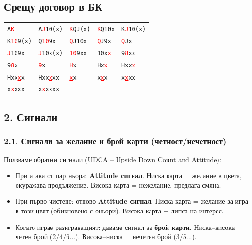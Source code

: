 \documentclass[10pt,a5paper]{extarticle}
\newcommand{\leadhil}[1]{\textcolor{red}{\uline{#1}}}
\begin{document}

\subsection*{Срещу договор в БК}

\begin{center}
\renewcommand{\arraystretch}{1.3} %
\setlength{\tabcolsep}{6pt}       %

\begin{tabularx}{\textwidth}{|X|X|X|X|X|}
\hline
\texttt{A\leadhil{K}} & \texttt{A\leadhil{J}10(x)} & \texttt{\leadhil{K}QJ(x)} & \texttt{\leadhil{K}Q10x} & \texttt{K\leadhil{J}10(x)} \\
\texttt{K\leadhil{10}9(x)} & \texttt{Q\leadhil{10}9x} & \texttt{\leadhil{Q}J10x} & \texttt{\leadhil{Q}J9x} & \texttt{\leadhil{Q}Jx} \\
\texttt{\leadhil{J}109x} & \texttt{\leadhil{J}10x(x)} & \texttt{\leadhil{10}9xx} & \texttt{10x\leadhil{x}} & \texttt{9\leadhil{8}xx} \\
\texttt{9\leadhil{8}x} & \texttt{\leadhil{9}x} & \texttt{\leadhil{H}x} & \texttt{Hx\leadhil{x}} & \texttt{Hxx\leadhil{x}} \\
\texttt{Hxx\leadhil{x}x} & \texttt{Hxx\leadhil{x}xx} & \texttt{\leadhil{x}x} & \texttt{x\leadhil{x}x} & \texttt{x\leadhil{x}xx} \\
\texttt{x\leadhil{x}xxx} & \texttt{x\leadhil{x}xxxx} & & & \\ %
\hline
\end{tabularx}
\end{center}

\subsection*{2. Сигнали}

\subsubsection*{2.1. Сигнали за желание и брой карти (четност/нечетност)}
Ползваме обратни сигнали (UDCA – Upside Down Count and Attitude):  
\begin{itemize}
    \item[] При атака от партньора: \textbf{Attitude сигнал}.  
        Ниска карта = желание в цвета, окуражава продължение.  
        Висока карта = нежелание, предлага смяна.
    \item[] При първо чистене: отново \textbf{Attitude сигнал}.  
        Ниска карта = желание за игра в този цвят (обикновено с оньори).  
        Висока карта = липса на интерес.
    \item[] Когато играе разиграващият: даваме сигнал за \textbf{брой карти}.  
        Ниска–висока = четен брой (2/4/6...).  
        Висока–ниска = нечетен брой (3/5...).
\end{itemize}
\end{document}
